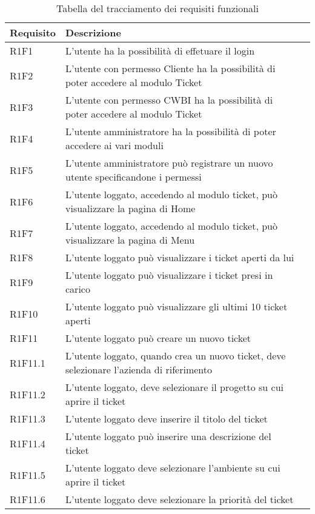 \begin{table}[!h]
\caption{Tabella del tracciamento dei requisiti funzionali}
{\renewcommand{\arraystretch}{2}
\label{tab:requisiti-funzionali}
\begin{tabularx}{\textwidth}{PXl}
\hline\hline
\textbf{Requisito} & \textbf{Descrizione}\\
\hline

R1F1 & L'utente ha la possibilità di effetuare il login\\
\hline
R1F2 & L'utente con permesso Cliente ha la possibilità di poter accedere al modulo Ticket\\
\hline
R1F3 & L'utente con permesso CWBI ha la possibilità di poter accedere al modulo Ticket\\
\hline
R1F4	 & L'utente amministratore ha la possibilità di poter accedere ai vari moduli\\
\hline
R1F5 & L'utente amministratore può registrare un nuovo utente specificandone i permessi\\
\hline
R1F6 & L'utente loggato, accedendo al modulo ticket, può visualizzare la pagina di Home\\
\hline
R1F7 & L'utente loggato, accedendo al modulo ticket, può visualizzare la pagina di Menu\\
\hline
R1F8 & L'utente loggato può visualizzare i ticket aperti da lui\\
\hline
R1F9 & L'utente loggato può visualizzare i ticket presi in carico\\
\hline
R1F10 & L'utente loggato può visualizzare gli ultimi 10 ticket aperti\\
\hline

R1F11 & L'utente loggato può creare un nuovo ticket\\
\hline
R1F11.1 & L'utente loggato, quando crea un nuovo ticket, deve selezionare l'azienda di riferimento\\
\hline
R1F11.2 & L'utente loggato, deve selezionare il progetto su cui aprire il ticket\\
\hline
R1F11.3 & L'utente loggato deve inserire il titolo del ticket\\
\hline
R1F11.4 & L'utente loggato può inserire una descrizione del ticket\\
\hline
R1F11.5 & L'utente loggato deve selezionare l'ambiente su cui aprire il ticket\\
\hline
R1F11.6 & L'utente loggato deve selezionare la priorità del ticket\\
\hline

\end{tabularx}
}
\end{table}

